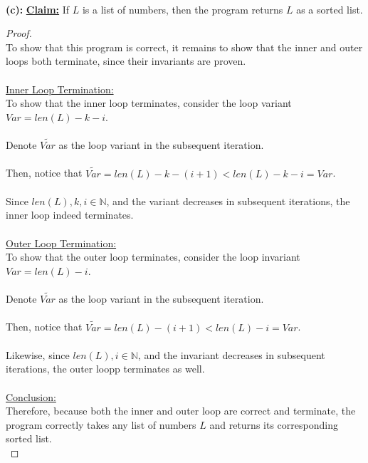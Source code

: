 \documentclass[12pt]{article}
\begin{document}
\leavevmode\\
\textbf{(c):}
\textbf{\underline{Claim:}} If $L$ is a list of numbers, then the program returns $L$ as a sorted list. \\
\begin{proof}
\leavevmode\\
    To show that this program is correct, it remains to show that the inner and outer loops both terminate, since their invariants are proven. \\
    \\
    \underline{Inner Loop Termination:} \\
    To show that the inner loop terminates, consider the loop variant $Var = len(L) - k - i$. \\
    \\
    Denote $\widetilde{Var}$ as the loop variant in the subsequent iteration. \\
    \\
    Then, notice that $\widetilde{Var} = len(L) - k - (i + 1) < len(L) - k - i = Var$. \\
    \\
    Since $len(L), k, i \in \mathbb{N}$, and the variant decreases in subsequent iterations, the inner loop indeed terminates. \\
    \\
    \underline{Outer Loop Termination:} \\
    To show that the outer loop terminates, consider the loop invariant $Var = len(L) - i$. \\
    \\
    Denote $\widetilde{Var}$ as the loop variant in the subsequent iteration. \\
    \\
    Then, notice that $\widetilde{Var} = len(L) - (i + 1) < len(L) - i = Var$. \\
    \\
    Likewise, since $len(L), i \in \mathbb{N}$, and the invariant decreases in subsequent iterations, the outer loopp terminates as well. \\
    \\
    \underline{Conclusion:} \\
    Therefore, because both the inner and outer loop are correct and terminate, the program correctly takes any list of numbers $L$ and returns its corresponding sorted list. \\
\end{proof}
\leavevmode\\
\end{document}
